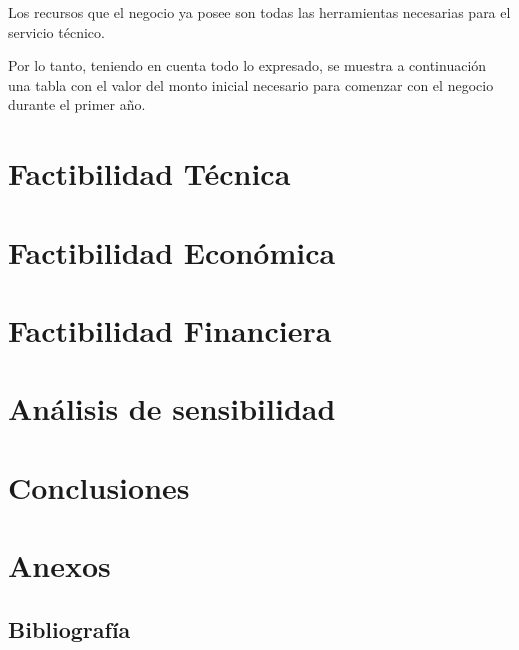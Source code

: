 \documentclass[11pt,a4paper]{article}
\begin{document}
Los recursos que el negocio ya posee son todas las herramientas necesarias para el servicio técnico.

Por lo tanto, teniendo en cuenta todo lo expresado, se muestra a continuación una tabla con el valor del monto inicial necesario para comenzar con el negocio durante el primer año.



\section{Factibilidad Técnica}
\section{Factibilidad Económica}
\section{Factibilidad Financiera}
\section{Análisis de sensibilidad}
\section{Conclusiones}
\section{Anexos}
\subsection{Bibliografía}
\end{document}
